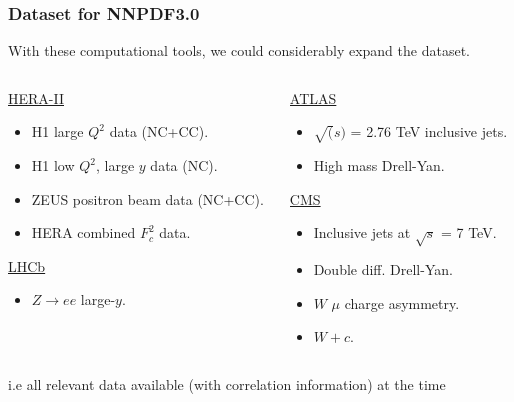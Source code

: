 \documentclass[10pt]{beamer}
\begin{document}
\begin{frame}
\frametitle{Dataset for NNPDF3.0}
With these computational tools, we could considerably expand the dataset.\\
\vskip10pt

\begin{columns}
  \begin{column}{0.5\textwidth}
  
	\underline{HERA-II}
	\begin{itemize}
	\item H1 large $Q^2$ data (NC+CC).
	\item H1 low $Q^2$, large $y$ data (NC).
	\item ZEUS positron beam data (NC+CC).
	\item HERA combined $F^2_c$ data.
	\end{itemize}
	\vskip 10pt
	\underline{LHCb}
	\begin{itemize}
	\item $Z \to ee$ large-$y$.
	\end{itemize}
	
\end{column}

  \begin{column}{0.5\textwidth}
  
          \underline{ATLAS}
  	  \begin{itemize}
	  	\item $\sqrt(s)$ = 2.76 TeV inclusive jets.
		\item High mass Drell-Yan.
	  \end{itemize}
	\vskip 10pt 
	\underline{CMS}
	\begin{itemize}
	\item Inclusive jets at $\sqrt{s}$ = 7 TeV.
	\item Double diff. Drell-Yan.
	\item $W$ $\mu$ charge asymmetry.
	\item $W+c$.
	\end{itemize}
	
\end{column}

\end{columns}
\vskip 15pt
i.e all relevant data available (with correlation information) at the time

\end{frame}
\end{document}
